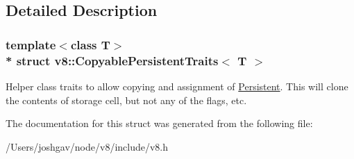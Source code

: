 \subsection{Detailed Description}
\subsubsection*{template$<$class T$>$\\*
struct v8\+::\+Copyable\+Persistent\+Traits$<$ T $>$}

Helper class traits to allow copying and assignment of \hyperlink{classv8_1_1_persistent}{Persistent}. This will clone the contents of storage cell, but not any of the flags, etc. 

The documentation for this struct was generated from the following file\+:\begin{DoxyCompactItemize}
\item 
/\+Users/joshgav/node/v8/include/v8.\+h\end{DoxyCompactItemize}
